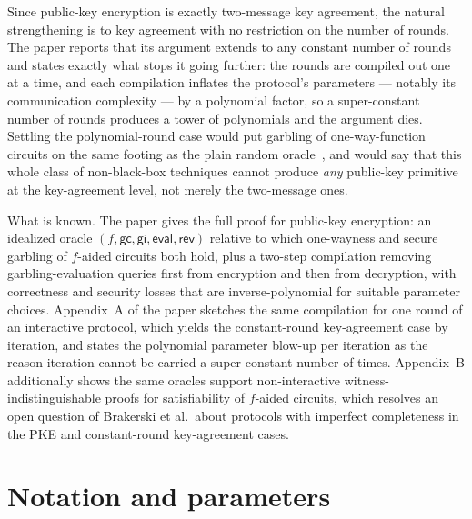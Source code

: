 \documentclass{aicr-conjecture}
\newcommand{\gc}{\mathsf{gc}}
\newcommand{\gi}{\mathsf{gi}}
\newcommand{\evl}{\mathsf{eval}}
\newcommand{\rev}{\mathsf{rev}}
\begin{document}
Since public-key encryption is exactly two-message key agreement, the
natural strengthening is to key agreement with no restriction on the
number of rounds. The paper reports that its argument extends to any
constant number of rounds and states exactly what stops it going further:
the rounds are compiled out one at a time, and each compilation inflates
the protocol's parameters --- notably its communication complexity --- by
a polynomial factor, so a super-constant number of rounds produces a tower
of polynomials and the argument dies. Settling the polynomial-round case
would put garbling of one-way-function circuits on the same footing as the
plain random oracle~\cite{IR89,BMG09}, and would say that this whole class
of non-black-box techniques cannot produce \emph{any} public-key primitive
at the key-agreement level, not merely the two-message ones.

What is known. The paper gives the full proof for public-key encryption:
an idealized oracle $(f,\gc,\gi,\evl,\rev)$ relative to which one-wayness
and secure garbling of $f$-aided circuits both hold, plus a two-step
compilation removing garbling-evaluation queries first from encryption and
then from decryption, with correctness and security losses that are
inverse-polynomial for suitable parameter choices. Appendix~A of the paper
sketches the same compilation for one round of an interactive protocol,
which yields the constant-round key-agreement case by iteration, and
states the polynomial parameter blow-up per iteration as the reason
iteration cannot be carried a super-constant number of times. Appendix~B
additionally shows the same oracles support non-interactive
witness-indistinguishable proofs for satisfiability of $f$-aided circuits,
which resolves an open question of Brakerski et al.\ about protocols with
imperfect completeness in the PKE and constant-round key-agreement cases.

\section{Notation and parameters}\label{sec:notation}
\end{document}
